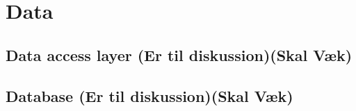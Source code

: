 \chapter{Data}

\section{Data access layer (Er til diskussion)(Skal Væk)}

\section{Database (Er til diskussion)(Skal Væk)}


%

